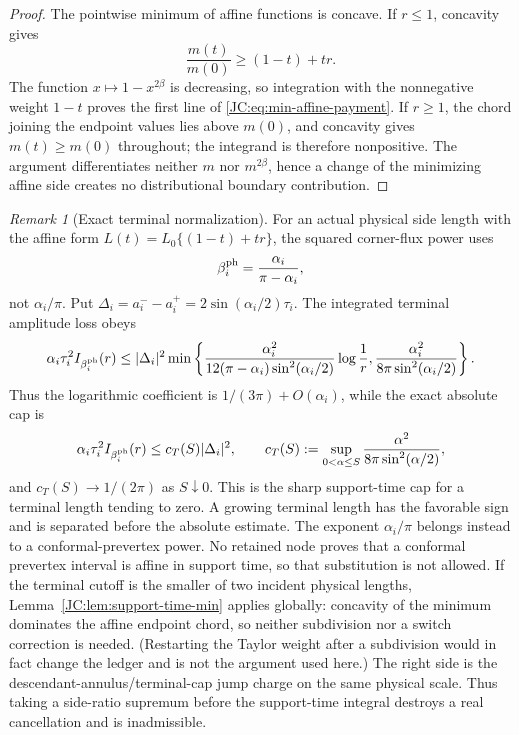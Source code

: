 \documentclass[11pt]{amsart}
\numberwithin{equation}{section}
\theoremstyle{definition}
\theoremstyle{remark}
\newtheorem{remark}[theorem]{Remark}
\begin{document}
\begin{proof}
The pointwise minimum of affine functions is concave.  If $r\le1$,
concavity gives
\[
 \frac{m(t)}{m(0)}\ge(1-t)+tr.
\]
The function $x\mapsto1-x^{2\beta}$ is decreasing, so integration with
the nonnegative weight $1-t$ proves the first line of
\eqref{JC:eq:min-affine-payment}.  If $r\ge1$, the chord joining the endpoint
values lies above $m(0)$, and concavity gives $m(t)\ge m(0)$ throughout;
the integrand is therefore nonpositive.  The argument differentiates
neither $m$ nor $m^{2\beta}$, hence a change of the minimizing affine side
creates no distributional boundary contribution.
\end{proof}

\begin{remark}[Exact terminal normalization]
For an actual physical side length with the affine form
$L(t)=L_0\{(1-t)+tr\}$, the squared corner-flux power uses
\begin{equation}\label{JC:eq:physical-corner-exponent}
 \beta_i^{\rm ph}=\frac{\alpha_i}{\pi-\alpha_i},
\end{equation}
not $\alpha_i/\pi$.  Put
$\Delta_i=a_i^--a_i^+=2\sin(\alpha_i/2)\tau_i$.  The integrated terminal
amplitude loss obeys
\begin{equation}\label{JC:eq:terminal-log-payment}
 \alpha_i\tau_i^2 I_{\beta_i^{\rm ph}}(r)
 \le |\Delta_i|^2\min\left\{
 \frac{\alpha_i^2}{12(\pi-\alpha_i)\sin^2(\alpha_i/2)}
       \log\frac1r,
 \frac{\alpha_i^2}{8\pi\sin^2(\alpha_i/2)}\right\}.
\end{equation}
Thus the logarithmic coefficient is $1/(3\pi)+O(\alpha_i)$, while the
exact absolute cap is
\begin{equation}\label{JC:eq:terminal-absolute-payment}
 \alpha_i\tau_i^2 I_{\beta_i^{\rm ph}}(r)
 \le c_T(S)|\Delta_i|^2,
 \qquad
 c_T(S):=\sup_{0<\alpha\le S}
 \frac{\alpha^2}{8\pi\sin^2(\alpha/2)},
\end{equation}
and $c_T(S)\to1/(2\pi)$ as $S\downarrow0$.  This is the sharp
support-time cap for a terminal length tending to zero.  A growing
terminal length has the favorable sign and is separated before the
absolute estimate.
The exponent $\alpha_i/\pi$ belongs instead to a conformal-prevertex
power.  No retained node proves that a conformal prevertex interval is
affine in support time, so that substitution is not allowed.  If the
terminal cutoff is the smaller of two incident physical lengths,
Lemma~\ref{JC:lem:support-time-min} applies globally: concavity of the
minimum dominates the affine endpoint chord, so neither subdivision nor a
switch correction is needed.  (Restarting the Taylor weight after a
subdivision would in fact change the ledger and is not the argument used
here.)
The right side is the descendant-annulus/terminal-cap jump charge on the
same physical scale.  Thus taking a side-ratio supremum before the
support-time integral destroys a real cancellation and is inadmissible.
\end{remark}
\end{document}
